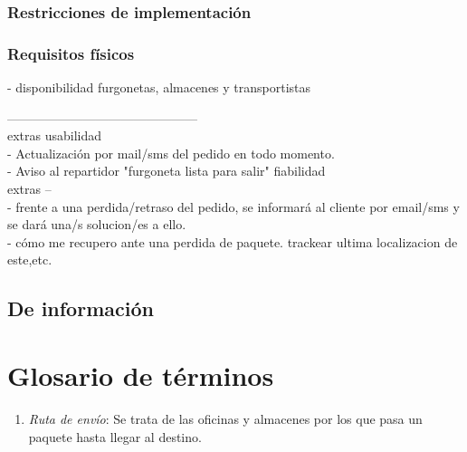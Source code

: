 \subsubsection{Restricciones de implementación}

\subsubsection{Requisitos físicos}
- disponibilidad furgonetas, almacenes y transportistas

--------------------------------------------- \\
extras usabilidad \\
- Actualización por mail/sms del pedido en todo momento. \\
- Aviso al repartidor "furgoneta lista para salir"
fiabilidad \\
extras -- \\
- frente a una perdida/retraso del pedido, se informará al cliente por email/sms y se dará una/s solucion/es a ello.\\
- cómo me recupero ante una perdida de paquete. trackear ultima localizacion de este,etc. \\


\newpage

\subsection{De información}

\newpage

\section{Glosario de términos}
	\begin{enumerate}
		\item \textit{Ruta de envío}: Se trata de las oficinas y almacenes por los que pasa un paquete hasta llegar al destino.
	\end{enumerate}
\newpage


